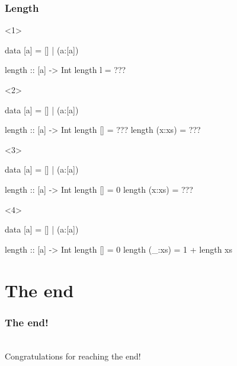 \documentclass[17pt]{beamer}
\renewcommand{\(}[1]{\begin{columns}[#1]}
\renewcommand{\)}{\end{columns}}
\newcommand{\<}[1]{\begin{column}{#1}}
\renewcommand{\>}{\end{column}}
\begin{document}
\begin{frame}[fragile]
\frametitle{Length}
\begin{minipage}[t][.4\textheight]{\textwidth}
\begin{onlyenv}<1>
  \begin{code}
    data [a] = [] | (a:[a])

    length :: [a] -> Int
    length l = ???
  \end{code}
\end{onlyenv}
\begin{onlyenv}<2>
  \begin{code}
    data [a] = [] | (a:[a])

    length :: [a] -> Int
    length []     = ???
    length (x:xs) = ???
  \end{code}
\end{onlyenv}
\begin{onlyenv}<3>
  \begin{code}
    data [a] = [] | (a:[a])

    length :: [a] -> Int
    length []     = 0
    length (x:xs) = ???
  \end{code}
\end{onlyenv}
\begin{onlyenv}<4>
  \begin{code}
    data [a] = [] | (a:[a])

    length :: [a] -> Int
    length []     = 0
    length (_:xs) = 1 + length xs
  \end{code}
\end{onlyenv}
\end{minipage}
\begin{minipage}[c][.3\textheight]{\textwidth}
\begin{center}
\end{center}
\end{minipage}
\end{frame}




\section{The end}

\begin{frame}
  \frametitle{The end!}
  \begin{center}
    ~\\
    Congratulations for reaching the end!
  \end{center}
\end{frame}
\end{document}
